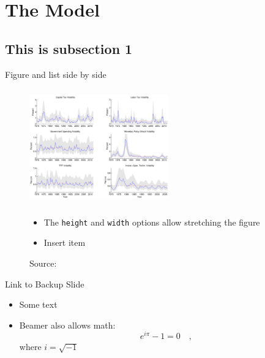 \documentclass[aspectratio=169]{beamer}
\begin{document}
\section{The Model}
\subsection{This is subsection 1}

\begin{frame}{Figure and list side by side}
    \begin{figure}[htbp!]
        \begin{minipage}{0.55\linewidth}
            \includegraphics[height=5cm,width=6cm]{smoothedvariances}
            \caption{Source:  \textcite{BornPfeifer2014JME}}
        \end{minipage}
        \begin{minipage}{0.4\linewidth}
            \begin{itemize}
            \item The \texttt{height} and \texttt{width} options allow stretching the figure
            \item Insert item
            \end{itemize}
        \end{minipage}
    \end{figure}
\end{frame}


\begin{frame}{Link to Backup Slide}\label{modelstructure} %
        \begin{itemize}
            \item Some text
            \item Beamer also allows math:
            \begin{equation}
                e^{i\pi}-1=0 \quad ,
            \end{equation}
            where $i=\sqrt{-1}$
        \end{itemize}
\hyperlink{model_appendix}{} %
\end{frame}
\end{document}
